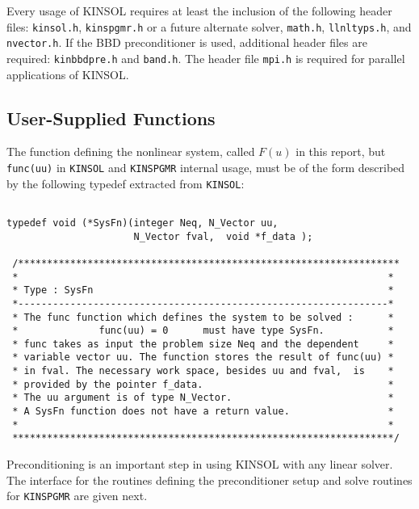 Every usage of KINSOL requires at least the inclusion of the following header
files:  {\tt kinsol.h}, {\tt kinspgmr.h} or a future alternate solver, 
{\tt math.h}, {\tt llnltyps.h}, and {\tt nvector.h}. If the BBD preconditioner is
used, additional header files are required: {\tt kinbbdpre.h} and {\tt band.h}.
The header file {\tt mpi.h} is required for parallel applications of KINSOL.



\subsection{User-Supplied Functions}

The function defining the nonlinear system, called $F(u)$ in this report,
but {\tt func(uu)} in {\tt KINSOL} and {\tt KINSPGMR} internal usage, must be of
the form described by the following typedef extracted from {\tt KINSOL}:

\small
\begin{verbatim}

typedef void (*SysFn)(integer Neq, N_Vector uu, 
                      N_Vector fval,  void *f_data );

 /******************************************************************
 *                                                                *
 * Type : SysFn                                                   *
 *----------------------------------------------------------------*        
 * The func function which defines the system to be solved :      *
 *              func(uu) = 0      must have type SysFn.           *
 * func takes as input the problem size Neq and the dependent     *
 * variable vector uu. The function stores the result of func(uu) *
 * in fval. The necessary work space, besides uu and fval,  is    *
 * provided by the pointer f_data.                                *
 * The uu argument is of type N_Vector.                           *
 * A SysFn function does not have a return value.                 *
 *                                                                *
 ******************************************************************/

\end{verbatim}
\normalsize

Preconditioning is an important step in using KINSOL with any linear
solver. The interface for the routines defining the preconditioner
setup and solve routines for {\tt KINSPGMR} are given next.

